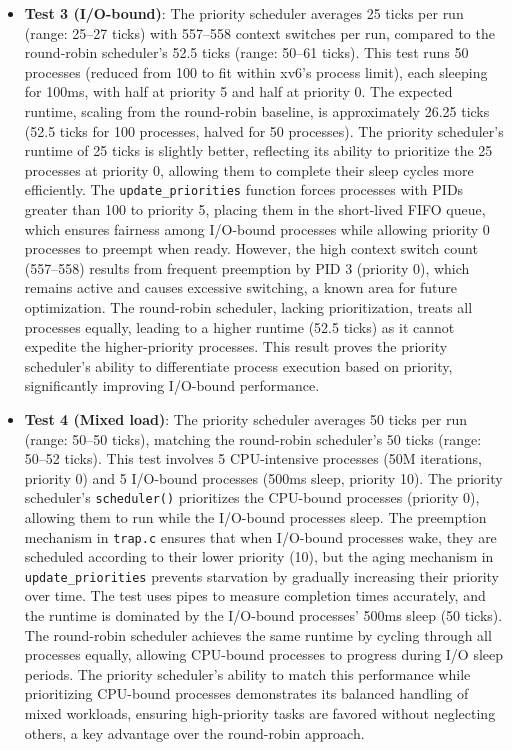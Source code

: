 \documentclass{article}
\begin{document}
\begin{itemize}
    \item \textbf{Test 3 (I/O-bound)}: The priority scheduler averages 25 ticks per run (range: 25–27 ticks) with 557–558 context switches per run, compared to the round-robin scheduler’s 52.5 ticks (range: 50–61 ticks). This test runs 50 processes (reduced from 100 to fit within xv6’s process limit), each sleeping for 100ms, with half at priority 5 and half at priority 0. The expected runtime, scaling from the round-robin baseline, is approximately 26.25 ticks (52.5 ticks for 100 processes, halved for 50 processes). The priority scheduler’s runtime of 25 ticks is slightly better, reflecting its ability to prioritize the 25 processes at priority 0, allowing them to complete their sleep cycles more efficiently. The \texttt{update\_priorities} function forces processes with PIDs greater than 100 to priority 5, placing them in the short-lived FIFO queue, which ensures fairness among I/O-bound processes while allowing priority 0 processes to preempt when ready. However, the high context switch count (557–558) results from frequent preemption by PID 3 (priority 0), which remains active and causes excessive switching, a known area for future optimization. The round-robin scheduler, lacking prioritization, treats all processes equally, leading to a higher runtime (52.5 ticks) as it cannot expedite the higher-priority processes. This result proves the priority scheduler’s ability to differentiate process execution based on priority, significantly improving I/O-bound performance.

    \item \textbf{Test 4 (Mixed load)}: The priority scheduler averages 50 ticks per run (range: 50–50 ticks), matching the round-robin scheduler’s 50 ticks (range: 50–52 ticks). This test involves 5 CPU-intensive processes (50M iterations, priority 0) and 5 I/O-bound processes (500ms sleep, priority 10). The priority scheduler’s \texttt{scheduler()} prioritizes the CPU-bound processes (priority 0), allowing them to run while the I/O-bound processes sleep. The preemption mechanism in \texttt{trap.c} ensures that when I/O-bound processes wake, they are scheduled according to their lower priority (10), but the aging mechanism in \texttt{update\_priorities} prevents starvation by gradually increasing their priority over time. The test uses pipes to measure completion times accurately, and the runtime is dominated by the I/O-bound processes’ 500ms sleep (50 ticks). The round-robin scheduler achieves the same runtime by cycling through all processes equally, allowing CPU-bound processes to progress during I/O sleep periods. The priority scheduler’s ability to match this performance while prioritizing CPU-bound processes demonstrates its balanced handling of mixed workloads, ensuring high-priority tasks are favored without neglecting others, a key advantage over the round-robin approach.


\end{itemize}
\end{document}
